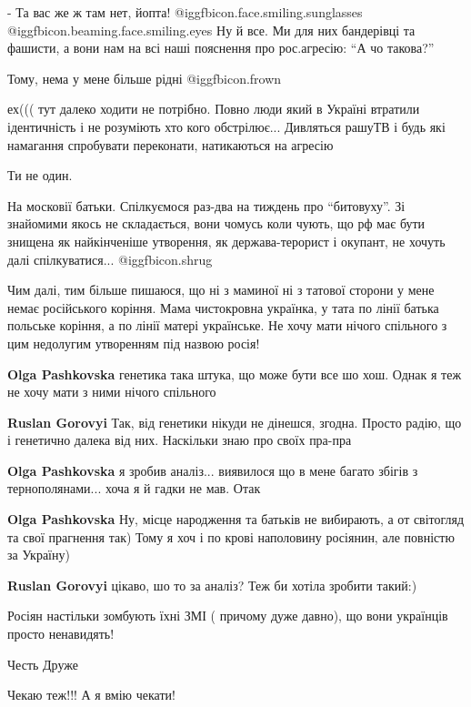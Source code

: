 \begin{itemize}
- Та вас же ж там нет, йопта!  @igg{fbicon.face.smiling.sunglasses}
@igg{fbicon.beaming.face.smiling.eyes}  Ну й все. Ми для них бандерівці та
фашисти, а вони нам на всі наші пояснення про рос.агресію: \enquote{А чо
такова?}

Тому, нема у мене більше рідні  @igg{fbicon.frown} 


ех((( тут далеко ходити не потрібно. Повно люди який в Україні втратили
ідентичність і не розуміють хто кого обстрілює... Дивляться рашуТВ і будь які
намагання спробувати переконати, натикаються на агресію

Ти не один.


На московії батьки. Спілкуємося раз-два на тиждень про \enquote{битовуху}. Зі знайомими
якось не складається, вони чомусь коли чують, що рф має бути знищена як
найкінченіше утворення, як держава-терорист і окупант, не хочуть далі
спілкуватися... @igg{fbicon.shrug} 


Чим далі, тим більше пишаюся, що ні з маминої ні з татової сторони у мене немає
російського коріння. Мама чистокровна українка, у тата по лінії батька польське
коріння, а по лінії матері українське. Не хочу мати нічого спільного з цим
недолугим утворенням під назвою росія!

\begin{itemize} %
\textbf{Olga Pashkovska} генетика така штука, що може бути все шо хош. Однак я теж не хочу мати з ними нічого спільного

\textbf{Ruslan Gorovyi} Так, від генетики нікуди не дінешся, згодна. Просто радію, що і генетично далека від них. Наскільки знаю про своїх пра-пра

\textbf{Olga Pashkovska} я зробив аналіз... виявилося що в мене багато збігів з тернополянами... хоча я й гадки не мав. Отак

\textbf{Olga Pashkovska} Ну, місце народження та батьків не вибирають, а от світогляд та свої прагнення так) Тому я хоч і по крові наполовину росіянин, але повністю за Україну)

\textbf{Ruslan Gorovyi} цікаво, шо то за аналіз? Теж би хотіла зробити такий:)
\end{itemize} %

Росіян настільки зомбують їхні ЗМІ ( причому дуже давно), що вони українців просто ненавидять!

Честь Друже

Чекаю теж!!! А я вмію чекати!

\end{itemize} %
